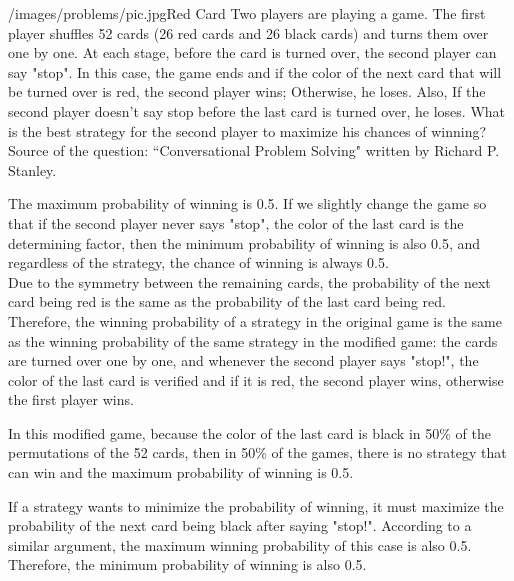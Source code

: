 \begin{problem}{/images/problems/pic.jpg}{Red Card}  Two players are playing a game. The first player shuffles 52 cards (26 red cards and 26 black cards) and turns them over one by one. At each stage, before the card is turned over, the second player can say "stop". In this case, the game ends and if the color of the next card that will be turned over is red, the second player wins; Otherwise, he loses. Also, If the second player doesn't say stop before the last card is turned over, he loses. What is the best strategy for the second player to maximize his chances of winning?\\[0.2cm]
	
Source of the question: ``Conversational Problem Solving" written by Richard P. Stanley.
\end{problem}
\begin{solution}
	The maximum probability of winning is 0.5. If we slightly change the game so that if the second player never says "stop", the color of the last card is the determining factor, then the minimum probability of winning is also 0.5, and regardless of the strategy, the chance of winning is always 0.5.\\[0.2cm]
	
	Due to the symmetry between the remaining cards, the probability of the next card being red is the same as the probability of the last card being red. Therefore, the winning probability of a strategy in the original game is the same as the winning probability of  the same strategy in the modified game: the cards are turned over one by one, and whenever the second player says "stop!", the color of the last card is verified and if it is red, the second player wins, otherwise the first player  wins.
	
	In this modified game, because the color of the last card is black in 50\% of the permutations of the 52 cards, then in 50\% of the games, there is no strategy that can win and the maximum probability of winning is 0.5.
	
	If a strategy wants to minimize the probability of winning, it must maximize the probability of the next card being black after saying "stop!". According to a similar argument, the maximum winning probability of this case is also 0.5. Therefore, the minimum probability of winning is also 0.5.
	
\end{solution}
